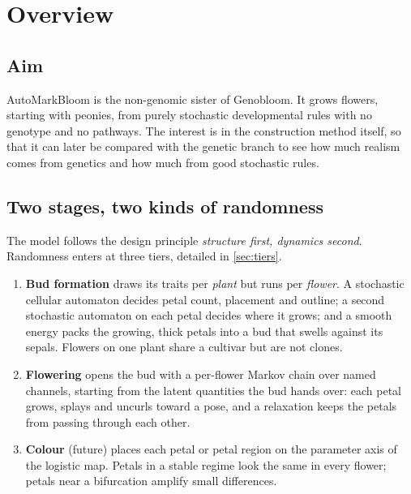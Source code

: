 \section{Overview}\label{sec:overview}

\subsection{Aim}
AutoMarkBloom is the non-genomic sister of Genobloom. It grows flowers, starting
with peonies, from purely stochastic developmental rules with no genotype and no
pathways. The interest is in the construction method itself, so that it can
later be compared with the genetic branch to see how much realism comes from
genetics and how much from good stochastic rules.

\subsection{Two stages, two kinds of randomness}
The model follows the design principle \emph{structure first, dynamics second}.
Randomness enters at three tiers, detailed in \cref{sec:tiers}.

\begin{enumerate}[leftmargin=*]
\item \textbf{Bud formation} draws its traits per \emph{plant} but runs per
  \emph{flower}. A stochastic cellular automaton decides petal count, placement
  and outline; a second stochastic automaton on each petal decides where it
  grows; and a smooth energy packs the growing, thick petals into a bud that
  swells against its sepals. Flowers on one plant share a cultivar but are not
  clones.
\item \textbf{Flowering} opens the bud with a per-flower Markov chain over
  named channels, starting from the latent quantities the bud hands over:
  each petal grows, splays and uncurls toward a pose, and a relaxation keeps
  the petals from passing through each other.
\item \textbf{Colour} (future) places each petal or petal region on the
  parameter axis of the logistic map. Petals in a stable regime look the same
  in every flower; petals near a bifurcation amplify small differences.
\end{enumerate}

